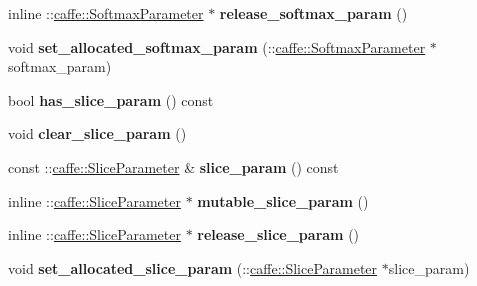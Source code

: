 \begin{DoxyCompactItemize}
inline \+::\mbox{\hyperlink{classcaffe_1_1_softmax_parameter}{caffe\+::\+Softmax\+Parameter}} $\ast$ {\bfseries release\+\_\+softmax\+\_\+param} ()
\item 
\mbox{\label{classcaffe_1_1_v1_layer_parameter_a9438215a625a5d4e40188120590ecc03}} 
void {\bfseries set\+\_\+allocated\+\_\+softmax\+\_\+param} (\+::\mbox{\hyperlink{classcaffe_1_1_softmax_parameter}{caffe\+::\+Softmax\+Parameter}} $\ast$softmax\+\_\+param)
\item 
\mbox{\label{classcaffe_1_1_v1_layer_parameter_a5ac41ea6cd67ce18704befc422f4ad63}} 
bool {\bfseries has\+\_\+slice\+\_\+param} () const
\item 
\mbox{\label{classcaffe_1_1_v1_layer_parameter_ae7d6109f3daff6dddd34abc3986225f2}} 
void {\bfseries clear\+\_\+slice\+\_\+param} ()
\item 
\mbox{\label{classcaffe_1_1_v1_layer_parameter_a69e5e86512c14e456f95c5cbc414f36b}} 
const \+::\mbox{\hyperlink{classcaffe_1_1_slice_parameter}{caffe\+::\+Slice\+Parameter}} \& {\bfseries slice\+\_\+param} () const
\item 
\mbox{\label{classcaffe_1_1_v1_layer_parameter_a4d1974664b2d054fa5a55efb7daaaa27}} 
inline \+::\mbox{\hyperlink{classcaffe_1_1_slice_parameter}{caffe\+::\+Slice\+Parameter}} $\ast$ {\bfseries mutable\+\_\+slice\+\_\+param} ()
\item 
\mbox{\label{classcaffe_1_1_v1_layer_parameter_a37832fd34ff147bdcb8d31ef3f44b6e5}} 
inline \+::\mbox{\hyperlink{classcaffe_1_1_slice_parameter}{caffe\+::\+Slice\+Parameter}} $\ast$ {\bfseries release\+\_\+slice\+\_\+param} ()
\item 
\mbox{\label{classcaffe_1_1_v1_layer_parameter_a4dd01fc77d2b0bf5554610096902590c}} 
void {\bfseries set\+\_\+allocated\+\_\+slice\+\_\+param} (\+::\mbox{\hyperlink{classcaffe_1_1_slice_parameter}{caffe\+::\+Slice\+Parameter}} $\ast$slice\+\_\+param)
\item 
\mbox{\label{classcaffe_1_1_v1_layer_parameter_ab9b409923395cd1c6ba3dc2a9dd6c36e}} 

\end{DoxyCompactItemize}
